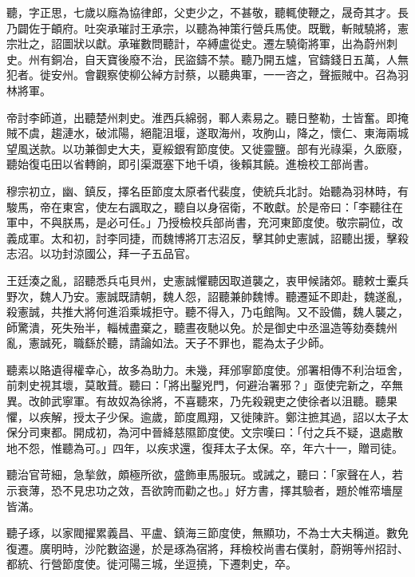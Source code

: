 \begin{pinyinscope}
 聽，字正思，七歲以廕為協律郎，父吏少之，不甚敬，聽輒使鞭之，晟奇其才。長乃闢佐于頔府。吐突承璀討王承宗，以聽為神策行營兵馬使。既戰，斬賊驍將，憲宗壯之，詔圖狀以獻。承璀數問聽計，卒縛盧從史。遷左驍衛將軍，出為蔚州刺史。州有銅冶，自天寶後廢不治，民盜鑄不禁。聽乃開五爐，官鑄錢日五萬，人無犯者。徙安州。會觀察使柳公綽方討蔡，以聽典軍，一一咨之，聲振賊中。召為羽林將軍。



 帝討李師道，出聽楚州刺史。淮西兵綿弱，鄆人素易之。聽日整勒，士皆奮。即掩賊不虞，趨漣水，破沭陽，絕龍沮堰，遂取海州，攻朐山，降之，懷仁、東海兩城望風送款。以功兼御史大夫，夏綏銀宥節度使。又徙靈鹽。部有光祿渠，久廞廢，聽始復屯田以省轉餉，即引渠溉塞下地千頃，後賴其饒。進檢校工部尚書。



 穆宗初立，幽、鎮反，擇名臣節度太原者代裴度，使統兵北討。始聽為羽林時，有駿馬，帝在東宮，使左右諷取之，聽自以身宿衛，不敢獻。於是帝曰：「李聽往在軍中，不與朕馬，是必可任。」乃授檢校兵部尚書，充河東節度使。敬宗嗣位，改義成軍。太和初，討李同捷，而魏博將丌志沼反，擊其帥史憲誠，詔聽出援，擊殺志沼。以功封涼國公，拜一子五品官。



 王廷湊之亂，詔聽悉兵屯貝州，史憲誠懼聽因取道襲之，衷甲候諸郊。聽敕士櫜兵野次，魏人乃安。憲誠既請朝，魏人怨，詔聽兼帥魏博。聽遷延不即赴，魏遂亂，殺憲誠，共推大將何進滔乘城拒守。聽不得入，乃屯館陶。又不設備，魏人襲之，師驚潰，死失殆半，輜械盡棄之，聽晝夜馳以免。於是御史中丞溫造等劾奏魏州亂，憲誠死，職繇於聽，請論如法。天子不罪也，罷為太子少師。



 聽素以賂遺得權幸心，故多為助力。未幾，拜邠寧節度使。邠署相傳不利治垣舍，前刺史視其壞，莫敢葺。聽曰：「將出鑿兇門，何避治署邪？」亟使完新之，卒無異。改帥武寧軍。有故奴為徐將，不喜聽來，乃先殺親吏之使徐者以沮聽。聽果懼，以疾解，授太子少保。逾歲，節度鳳翔，又徙陳許。鄭注摭其過，詔以太子太保分司東都。開成初，為河中晉絳慈隰節度使。文宗嘆曰：「付之兵不疑，退處散地不怨，惟聽為可。」四年，以疾求還，復拜太子太保。卒，年六十一，贈司徒。



 聽治官苛細，急揫斂，頗極所欲，盛飾車馬服玩。或誡之，聽曰：「家聲在人，若示衰薄，恐不見忠功之效，吾欲誇而勸之也。」好方書，擇其驗者，題於帷帟墻屋皆滿。



 聽子琢，以家閥擢累義昌、平盧、鎮海三節度使，無顯功，不為士大夫稱道。數免復遷。廣明時，沙陀數盜邊，於是琢為宿將，拜檢校尚書右僕射，蔚朔等州招討、都統、行營節度使。徙河陽三城，坐逗撓，下遷刺史，卒。




\end{pinyinscope}
